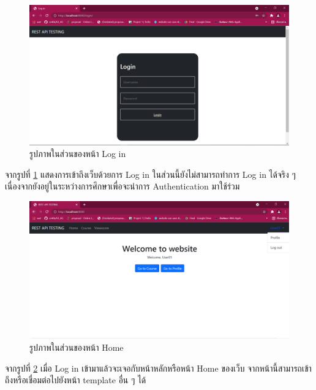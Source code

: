 \begin{figure}[!thb]
	\captionsetup{justification=centering}
	\centering
	\includegraphics[width=5in]{latex/figures/login.png}
	\caption{รูปภาพในส่วนของหน้า Log in}
	\label{fig:login}
\end{figure}
\noindent จากรูปที่ \ref{fig:login} แสดงการเข้าถึงเว็บด้วยการ Log in ในส่วนนี้ยังไม่สามารถทำการ Log in ได้จริง ๆ เนื่องจากยังอยู่ในระหว่างการศึกษาเพื่อจะนำการ Authentication มาใช้ร่วม
\newline
\begin{figure}[!thb]
	\captionsetup{justification=centering}
	\centering
	\includegraphics[width=5in]{latex/figures/home.png}
	\caption{รูปภาพในส่วนของหน้า Home}
	\label{fig:home}
\end{figure}
\newline
จากรูปที่ \ref{fig:home} เมื่อ Log in เข้ามาแล้วจะเจอกับหน้าหลักหรือหน้า Home ของเว็บ จากหน้านี้สามารถเข้าถึงหรือเชื่อมต่อไปยังหน้า template อื่น ๆ ได้
\newpage

